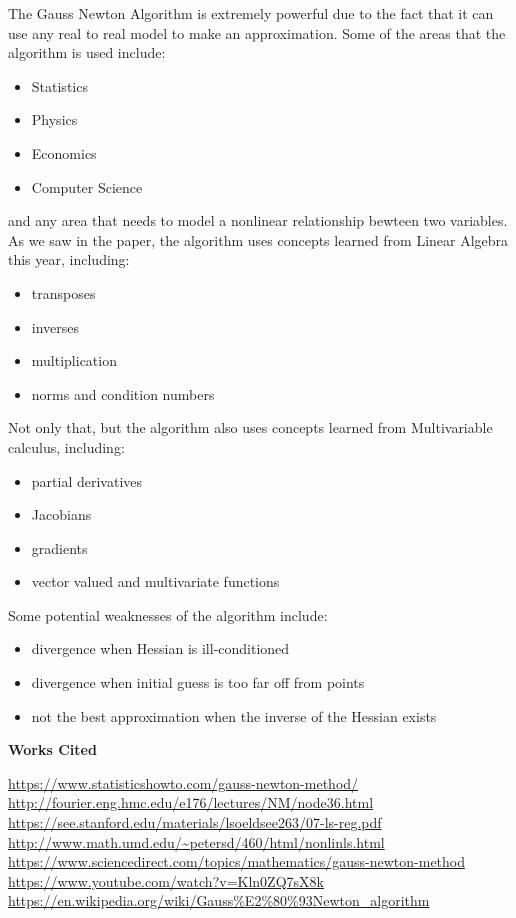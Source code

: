 \documentclass[12pt]{article}
\begin{document}
The Gauss Newton Algorithm is extremely powerful due to the fact that it can use any real to real model to make an approximation. 
Some of the areas that the algorithm is used include: \begin{itemize} \item Statistics \item Physics \item Economics \item Computer Science\end{itemize} and any area that needs to model a nonlinear relationship bewteen two variables. As we saw in the paper, the algorithm uses concepts learned from Linear Algebra this year, including: \begin{itemize} \item transposes  \item inverses  \item multiplication  \item norms and condition numbers \end{itemize} Not only that, but the algorithm also uses concepts learned from Multivariable calculus, including: \begin{itemize} \item partial derivatives \item Jacobians \item gradients \item vector valued and multivariate functions \end{itemize} Some potential weaknesses of the algorithm include: \begin{itemize} \item divergence when Hessian is ill-conditioned \item divergence when initial guess is too far off from points \item not the best approximation when the inverse of the Hessian exists \end{itemize}

\pagebreak

\begin{center}
\textbf{Works Cited}
\end{center}

\url{https://www.statisticshowto.com/gauss-newton-method/} 
\vskip 0.2cm
\url{http://fourier.eng.hmc.edu/e176/lectures/NM/node36.html}
\vskip 0.2cm
\url{https://see.stanford.edu/materials/lsoeldsee263/07-ls-reg.pdf}
\vskip 0.2cm
\url{http://www.math.umd.edu/~petersd/460/html/nonlinls.html}
\vskip 0.2cm
\url{https://www.sciencedirect.com/topics/mathematics/gauss-newton-method}
\vskip 0.2cm
\url{https://www.youtube.com/watch?v=Kln0ZQ7sX8k}
\vskip 0.2cm
\url{https://en.wikipedia.org/wiki/Gauss%E2%80%93Newton_algorithm}
\end{document}
